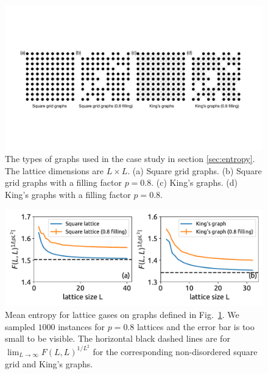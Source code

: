 \documentclass[onefignum, onetabnum]{siamart190516}
\newcommand{\<}{\langle}
\renewcommand{\>}{\rangle}
\newcommand{\Fig}[1]{Fig.~\ref{#1}}
\begin{document}
\begin{figure}[t] 
    \centering
    \includegraphics[width=\textwidth, trim={0cm 0cm 0cm 0cm}, clip]{lattices.pdf}
    \caption{The types of graphs used in the case study in section \ref{sec:entropy}.
    The lattice dimensions are $L\times L$. (a) Square grid graphs. (b) Square grid graphs with a filling factor $p=0.8$.
    (c) King's graphs. (d) King's graphs with a filling factor $p=0.8$.}
    \label{fig:lattices}
\end{figure}

\begin{figure}[t] 
    \centering
    \includegraphics[width=\textwidth, trim={0cm 0cm 0cm 0cm}, clip]{figures/fig5.pdf}
    \caption{Mean entropy for lattice gases on graphs defined in \Fig{fig:lattices}.
    We sampled $1000$ instances for $p=0.8$ lattices and the error bar is too small to be visible.
    The horizontal black dashed lines are for $\lim_{L\rightarrow \infty} F(L,L)^{1/L^2}$ for the corresponding non-disordered square grid and King's graphs.
    }
    \label{fig:hardsquare}
\end{figure}
\end{document}
